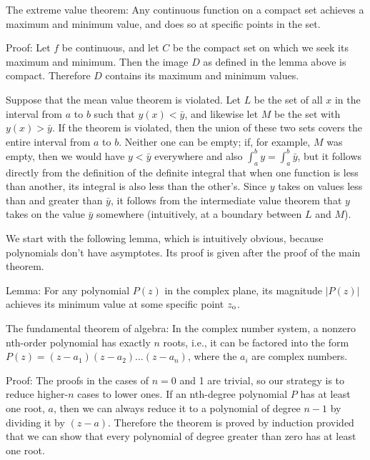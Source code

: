 The extreme value theorem: Any continuous function on a compact set achieves a maximum and minimum value,
and does so at specific points in the set.

Proof: Let $f$ be continuous, and let $C$ be the compact set on which we seek its maximum and minimum.
Then the image $D$ as defined in the lemma above is compact. Therefore $D$ contains its maximum and
minimum values.


Suppose that the mean value theorem is violated. Let $L$ be the set of all $x$ in the interval from $a$ to $b$
such that $y(x)<\bar{y}$, and likewise let $M$ be the set with $y(x)>\bar{y}$. If the theorem is violated, then
the union of these two sets covers the entire interval from $a$ to $b$. Neither one can be empty; if, for example, $M$ was
empty, then we would have $y<\bar{y}$ everywhere and also $\int_a^b y=\int_a^b\bar{y}$, but it follows directly from
the definition of the definite integral that when one function is less than another, its integral is also less
than the other's. Since $y$ takes on values less than and greater than $\bar{y}$, it follows from the intermediate value theorem
that $y$ takes on the value $\bar{y}$ somewhere (intuitively, at a boundary between $L$ and $M$).

\pagebreak


We start with the following lemma, which is intuitively obvious, because polynomials don't have asymptotes.
Its proof is given after the proof of the main theorem.

Lemma: For any polynomial $P(z)$ in the complex plane, its magnitude $|P(z)|$ achieves its minimum
value at some specific point $z_{\textup{o}}$.

The fundamental theorem of algebra: In the complex number system, a nonzero nth-order polynomial has exactly $n$
roots, i.e., it can be factored into the form $P(z)=(z-a_1)(z-a_2)\ldots(z-a_n)$,
where the $a_i$ are complex numbers.

Proof: The proofs in the cases of $n=0$ and 1 are trivial, so our strategy is to
reduce higher-$n$ cases to lower ones. If an nth-degree polynomial $P$ has at least
one root, $a$, then we can always reduce it to a polynomial of degree $n-1$ by
dividing it by $(z-a)$. Therefore the theorem is proved by induction provided that
we can show that every polynomial of degree greater than zero has at least one
root.

